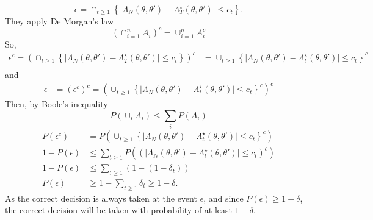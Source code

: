 {\begin{equation}\label{eq:epsilon}
    \mathbb{\epsilon} = \cap_{t\geq 1}\left\{\mid\Lambda_N\left(\theta, \theta'\right) - \Lambda_T^{\star} \left(\theta, \theta'\right) \mid \leq c_t\right\}.   
\end{equation}
They apply De Morgan's law 
\begin{equation}
    \left(\cap_{i=1}^n A_i\right)^c = \cup_{i=1}^n A_i^c
\end{equation}
So, 
\begin{equation}
\begin{split}
     \epsilon^c = \left(\cap _{t\geq 1}\left\{\mid \Lambda_N\left(\theta, \theta'\right) - \Lambda_T^{\star}\left(\theta, \theta'\right) \mid \leq c_t\right\}\right)^c &= \cup_{t\geq 1} \left\{\mid \Lambda_N\left(\theta, \theta'\right) - \Lambda_t^{\star}\left(\theta, \theta'\right) \mid \leq c_t\right\}^c \\
\end{split}
\end{equation}
and 
\begin{equation}
\begin{split}
    \epsilon &= \left(\epsilon^c\right)^c = \left(\cup_{t\geq 1} \left\{\mid \Lambda_N\left(\theta, \theta'\right) - \Lambda_t^{\star}\left(\theta, \theta'\right) \mid \leq c_t \right\}^c\right)^c 
\end{split}
\end{equation}{}
Then, by Boole's inequality
\begin{equation}\label{eq:Boole}
    P\left(\cup_i A_i \right) \leq \sum_{i} P\left(A_i\right)
\end{equation}
\begin{equation}
\begin{split}
       P\left(\epsilon^c\right) &= P\left(\cup_{t\geq 1} \left\{\mid\Lambda_N\left(\theta, \theta'\right)- \Lambda_t^{\star}\left(\theta, \theta'\right) \mid \leq c_t\right\}^c\right) \\
    1 - P\left(\epsilon\right) &\leq \sum_{t\geq 1} P\left(\left(\mid \Lambda_N\left(\theta, \theta'\right) - \Lambda_t^{\star}\left(\theta, \theta'\right) \mid \leq c_t \right)^c\right) \\ 
    1 - P\left(\epsilon\right) &\leq \sum_{t\geq 1} \left(1 - \left(1 - \delta_t\right)\right) \\
    P\left(\epsilon\right) &\geq 1 - \sum_{t\geq 1} \delta_t \geq 1 - \delta.  
\end{split}
\end{equation}
As the correct decision is always taken at the event $\epsilon$, and since $P\left(\epsilon\right)\geq 1- \delta$, the correct decision will be taken with probability of at least $1 - \delta$. 
}
